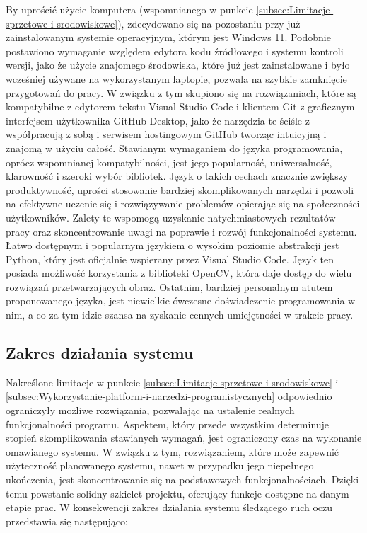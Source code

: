 \documentclass[a4paper,twoside,12pt]{book}
\begin{document}
By uprościć użycie komputera (wspomnianego w punkcie \ref{subsec:Limitacje-sprzetowe-i-srodowiskowe}), zdecydowano się na pozostaniu przy już zainstalowanym systemie operacyjnym, którym jest Windows 11. Podobnie postawiono wymaganie względem edytora kodu źródłowego i systemu kontroli wersji, jako że użycie znajomego środowiska, które już jest zainstalowane i było wcześniej używane na wykorzystanym laptopie, pozwala na szybkie zamknięcie przygotowań do pracy. W związku z tym skupiono się na rozwiązaniach, które są kompatybilne z edytorem tekstu Visual Studio Code i klientem Git z graficznym interfejsem użytkownika GitHub Desktop, jako że narzędzia te ściśle z współpracują z sobą i serwisem hostingowym GitHub tworząc intuicyjną i znajomą w użyciu całość. Stawianym wymaganiem do języka programowania, oprócz wspomnianej kompatybilności, jest jego popularność, uniwersalność, klarowność i szeroki wybór bibliotek. Język o takich cechach znacznie zwiększy produktywność, uprości stosowanie bardziej skomplikowanych narzędzi i pozwoli na efektywne uczenie się i rozwiązywanie problemów opierając się na społeczności użytkowników. Zalety te wspomogą uzyskanie natychmiastowych rezultatów pracy oraz skoncentrowanie uwagi na poprawie i rozwój funkcjonalności systemu. Łatwo dostępnym i popularnym językiem o wysokim poziomie abstrakcji jest Python, który jest oficjalnie wspierany przez Visual Studio Code. Język ten posiada możliwość korzystania z biblioteki OpenCV, która daje dostęp do wielu rozwiązań przetwarzających obraz. Ostatnim, bardziej personalnym atutem proponowanego języka, jest niewielkie ówczesne doświadczenie programowania w nim, a co za tym idzie szansa na zyskanie cennych umiejętności w trakcie pracy.

\subsection{Zakres działania systemu}
\label{subsec:zakres-dzialania-systemu}

Nakreślone limitacje w punkcie \ref{subsec:Limitacje-sprzetowe-i-srodowiskowe} i \ref{subsec:Wykorzystanie-platform-i-narzedzi-programistycznych} odpowiednio ograniczyły możliwe rozwiązania, pozwalając na ustalenie realnych funkcjonalności programu. Aspektem, który przede wszystkim determinuje stopień skomplikowania stawianych wymagań, jest ograniczony czas na wykonanie omawianego systemu. W związku z tym, rozwiązaniem, które może zapewnić użyteczność planowanego systemu, nawet w przypadku jego niepełnego ukończenia, jest skoncentrowanie się na podstawowych funkcjonalnościach. Dzięki temu powstanie solidny szkielet projektu, oferujący funkcje dostępne na danym etapie prac. W konsekwencji zakres działania systemu śledzącego ruch oczu przedstawia się następująco:
\end{document}
